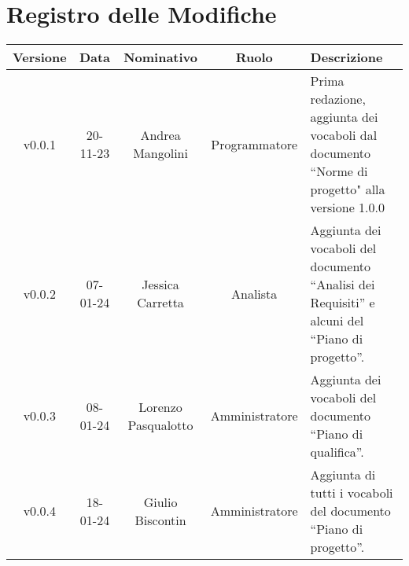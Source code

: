 \section*{\Large Registro delle Modifiche}
    \begin{table}[h]
        \centering
        \renewcommand\tabularxcolumn[1]{m{#1}} %
        \renewcommand{\arraystretch}{1.5}
        \begin{tabularx}{0.98\textwidth}
            {c|c|c|c|>{\centering\arraybackslash}X}
            \rowcolor{black}
            \textbf{\color{white} Versione} & \textbf{\color{white} Data} & \textbf{\color{white} Nominativo} & \textbf{\color{white} Ruolo} & \textbf{\color{white} Descrizione} \\ 
            \hline

            v0.0.1 & 20-11-23 & Andrea Mangolini & Programmatore & Prima redazione, aggiunta dei vocaboli dal documento ``Norme di progetto" alla versione 1.0.0 \\
            v0.0.2 & 07-01-24 & Jessica Carretta & Analista & Aggiunta dei vocaboli del documento ``Analisi dei Requisiti'' e alcuni del ``Piano di progetto''. \\
            v0.0.3 & 08-01-24 & Lorenzo Pasqualotto & Amministratore & Aggiunta dei vocaboli del documento ``Piano di qualifica''. \\
            v0.0.4 & 18-01-24 & Giulio Biscontin & Amministratore & Aggiunta di tutti i vocaboli del documento ``Piano di progetto''. \\
            \hline
        \end{tabularx}
    \end{table}
